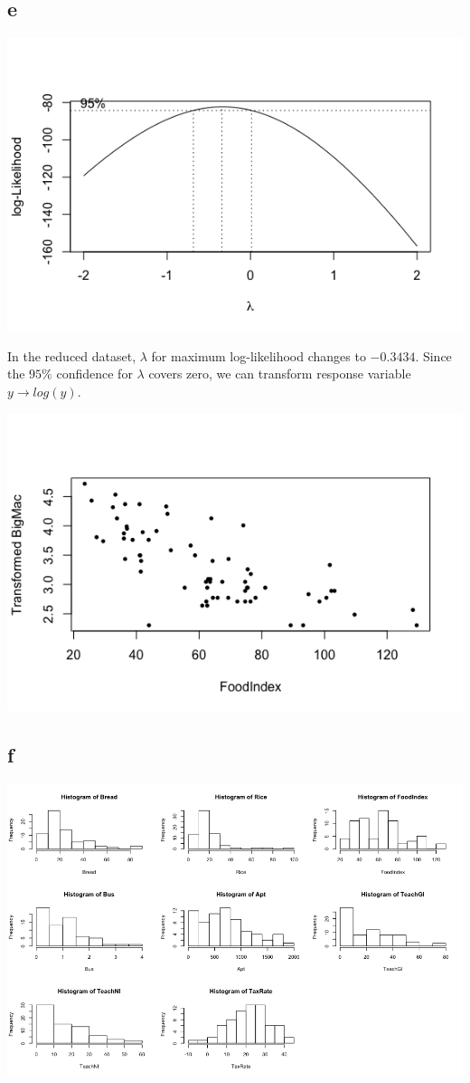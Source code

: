 \documentclass[11pt,letterpaper]{article}
\begin{document}
\subsection*{e}
\includegraphics[scale=0.7]{2-e-1.png}

\noindent In the reduced dataset, $\lambda$ for maximum log-likelihood changes to $-0.3434$. Since the $95 \%$ confidence for $\lambda$ covers zero, we can transform response variable $y \rightarrow log(y)$.

\includegraphics[scale=0.7]{2-e-2.png}

\subsection*{f}
\includegraphics[scale=0.5]{2-f-1.png}
\end{document}
